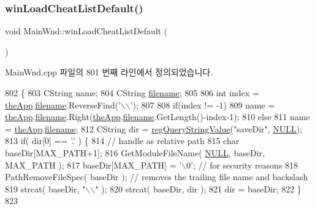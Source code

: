 \subsubsection{\texorpdfstring{win\+Load\+Cheat\+List\+Default()}{winLoadCheatListDefault()}}
{\footnotesize\ttfamily void Main\+Wnd\+::win\+Load\+Cheat\+List\+Default (\begin{DoxyParamCaption}{ }\end{DoxyParamCaption})}



Main\+Wnd.\+cpp 파일의 801 번째 라인에서 정의되었습니다.


\begin{DoxyCode}
802 \{
803   CString name;
804   CString \mbox{\hyperlink{_s_d_l_8cpp_ac33a174c39700095ca0f892624d85a3f}{filename}};
805 
806   \textcolor{keywordtype}{int} index = \mbox{\hyperlink{_v_b_a_8cpp_a8095a9d06b37a7efe3723f3218ad8fb3}{theApp}}.\mbox{\hyperlink{class_v_b_a_a66eee6b61ec8bee20f21164cb0c37d2d}{filename}}.ReverseFind(\textcolor{charliteral}{'\(\backslash\)\(\backslash\)'});
807 
808   \textcolor{keywordflow}{if}(index != -1)
809     name = \mbox{\hyperlink{_v_b_a_8cpp_a8095a9d06b37a7efe3723f3218ad8fb3}{theApp}}.\mbox{\hyperlink{class_v_b_a_a66eee6b61ec8bee20f21164cb0c37d2d}{filename}}.Right(\mbox{\hyperlink{_v_b_a_8cpp_a8095a9d06b37a7efe3723f3218ad8fb3}{theApp}}.\mbox{\hyperlink{class_v_b_a_a66eee6b61ec8bee20f21164cb0c37d2d}{filename}}.GetLength()-index-1);
810   \textcolor{keywordflow}{else}
811     name = \mbox{\hyperlink{_v_b_a_8cpp_a8095a9d06b37a7efe3723f3218ad8fb3}{theApp}}.\mbox{\hyperlink{class_v_b_a_a66eee6b61ec8bee20f21164cb0c37d2d}{filename}};
812   CString dir = \mbox{\hyperlink{_reg_8cpp_a618826d274df0d9c19fab2ff28bd9008}{regQueryStringValue}}(\textcolor{stringliteral}{"saveDir"}, \mbox{\hyperlink{getopt1_8c_a070d2ce7b6bb7e5c05602aa8c308d0c4}{NULL}});
813   \textcolor{keywordflow}{if}( dir[0] == \textcolor{charliteral}{'.'} ) \{
814       \textcolor{comment}{// handle as relative path}
815       \textcolor{keywordtype}{char} baseDir[MAX\_PATH+1];
816       GetModuleFileName( \mbox{\hyperlink{getopt1_8c_a070d2ce7b6bb7e5c05602aa8c308d0c4}{NULL}}, baseDir, MAX\_PATH );
817       baseDir[MAX\_PATH] = \textcolor{charliteral}{'\(\backslash\)0'}; \textcolor{comment}{// for security reasons}
818       PathRemoveFileSpec( baseDir ); \textcolor{comment}{// removes the trailing file name and backslash}
819       strcat( baseDir, \textcolor{stringliteral}{"\(\backslash\)\(\backslash\)"} );
820       strcat( baseDir, dir );
821       dir = baseDir;
822     \}
823 

\end{DoxyCode}
